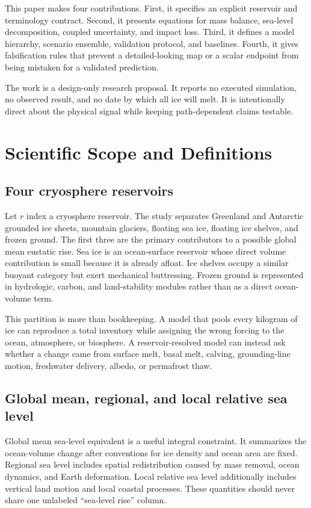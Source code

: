 \documentclass[conference]{IEEEtran}
\begin{document}
This paper makes four contributions. First, it specifies an explicit reservoir and terminology contract. Second, it presents equations for mass balance, sea-level decomposition, coupled uncertainty, and impact loss. Third, it defines a model hierarchy, scenario ensemble, validation protocol, and baselines. Fourth, it gives falsification rules that prevent a detailed-looking map or a scalar endpoint from being mistaken for a validated prediction.

The work is a design-only research proposal. It reports no executed simulation, no observed result, and no date by which all ice will melt. It is intentionally direct about the physical signal while keeping path-dependent claims testable.

\section{Scientific Scope and Definitions}

\subsection{Four cryosphere reservoirs}

Let $r$ index a cryosphere reservoir. The study separates Greenland and Antarctic grounded ice sheets, mountain glaciers, floating sea ice, floating ice shelves, and frozen ground. The first three are the primary contributors to a possible global mean eustatic rise. Sea ice is an ocean-surface reservoir whose direct volume contribution is small because it is already afloat. Ice shelves occupy a similar buoyant category but exert mechanical buttressing. Frozen ground is represented in hydrologic, carbon, and land-stability modules rather than as a direct ocean-volume term.

This partition is more than bookkeeping. A model that pools every kilogram of ice can reproduce a total inventory while assigning the wrong forcing to the ocean, atmosphere, or biosphere. A reservoir-resolved model can instead ask whether a change came from surface melt, basal melt, calving, grounding-line motion, freshwater delivery, albedo, or permafrost thaw.

\subsection{Global mean, regional, and local relative sea level}

Global mean sea-level equivalent is a useful integral constraint. It summarizes the ocean-volume change after conventions for ice density and ocean area are fixed. Regional sea level includes spatial redistribution caused by mass removal, ocean dynamics, and Earth deformation. Local relative sea level additionally includes vertical land motion and local coastal processes. These quantities should never share one unlabeled ``sea-level rise'' column.
\end{document}
